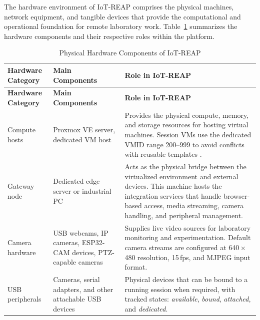 The hardware environment of IoT-REAP comprises the physical machines, network
equipment, and tangible devices that provide the computational and operational
foundation for remote laboratory work. Table~\ref{tab:hardware-env} summarizes
the hardware components and their respective roles within the platform.
\small
\begin{longtable}{|p{3cm}|p{3.6cm}|p{8cm}|}
  \caption{Physical Hardware Components of IoT-REAP}
  \label{tab:hardware-env}                                                                                        \\
  \hline
  \textbf{Hardware Category} & \textbf{Main Components}
                             & \textbf{Role in IoT-REAP}                                                          \\
  \hline
  \endfirsthead
  \hline
  \textbf{Hardware Category} & \textbf{Main Components}
                             & \textbf{Role in IoT-REAP}                                                          \\
  \hline
  \endhead
  \hline
  \endfoot
  \hline
  \endlastfoot

  Compute hosts              & Proxmox VE server, dedicated VM host                       & Provides the physical
  compute, memory, and storage resources for hosting virtual machines. Session
  VMs use the dedicated VMID range 200--999 to avoid conflicts with reusable
  templates {\footnotesize\cite{proxmox-ve-api}}.                                                                 \\ \hline

  Gateway node               & Dedicated edge server or industrial PC                     & Acts as the physical
  bridge between the virtualized environment and external devices. This machine
  hosts the integration services that handle browser-based access, media
  streaming, camera handling, and peripheral management.                                                          \\ \hline

  Camera hardware            & USB webcams, IP cameras, ESP32-CAM devices, PTZ-capable
  cameras                    & Supplies live video sources for laboratory monitoring and
  experimentation. Default camera streams are configured at 640\,$\times$\,480
  resolution, 15\,fps, and MJPEG input format.                                                                    \\ \hline

  USB peripherals            & Cameras, serial adapters, and other attachable USB devices &
  Physical devices that can be bound to a running session when required, with
  tracked states: \textit{available}, \textit{bound}, \textit{attached}, and
  \textit{dedicated}.                                                                                             \\ \hline


\end{longtable}
